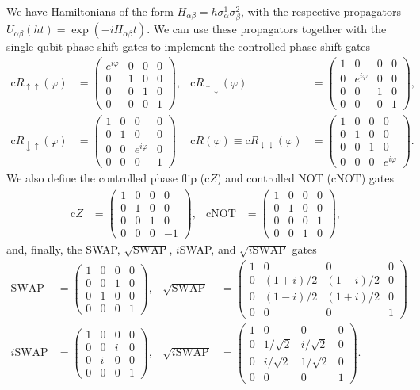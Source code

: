 \documentclass[11pt]{article}
\renewcommand{\t}{\text} %
\newcommand{\p}[1]{\left(#1\right)} %
\renewcommand{\d}{\partial} %
\renewcommand{\phi}{\varphi} %
\newcommand{\m}[1]{\begin{pmatrix}#1\end{pmatrix}} %
\renewcommand{\u}{\uparrow}
\renewcommand{\d}{\downarrow}
\begin{document}
We have Hamiltonians of the form
$H_{\alpha\beta}=h\sigma_\alpha^1\sigma_\beta^2$, with the respective
propagators $U_{\alpha\beta}\p{ht}=\exp\p{-iH_{\alpha\beta}t}$. We can
use these propagators together with the single-qubit phase shift gates
to implement the controlled phase shift gates
\begin{align}
  \t{c}R_{\u\u}\p\phi
  &=\m{e^{i \phi} & 0 & 0 & 0 \\
    0 & 1 & 0 & 0 \\
    0 & 0 & 1 & 0 \\
    0 & 0 & 0 & 1}, & \t{c}R_{\u\d}\p\phi
  &=\m{1 & 0 & 0 & 0 \\
    0 & e^{i \phi} & 0 & 0 \\
    0 & 0 & 1 & 0 \\
    0 & 0 & 0 & 1}, \\
  \t{c}R_{\d\u}\p\phi
  &=\m{1 & 0 & 0 & 0 \\
    0 & 1 & 0 & 0 \\
    0 & 0 & e^{i \phi} & 0 \\
    0 & 0 & 0 & 1} & \t{c}R\p\phi\equiv\t{c}R_{\d\d}\p\phi
  &=\m{1 & 0 & 0 & 0 \\
    0 & 1 & 0 & 0 \\
    0 & 0 & 1 & 0 \\
    0 & 0 & 0 & e^{i \phi}}.
\end{align}
We also define the controlled phase flip ($\t{c}Z$) and controlled NOT
($\t{cNOT}$) gates
\begin{align}
  \t{c}Z&=\m{1 & 0 & 0 & 0 \\
    0 & 1 & 0 & 0 \\
    0 & 0 & 1 & 0 \\
    0 & 0 & 0 & -1}, &
  \t{cNOT}&=\m{1 & 0 & 0 & 0 \\
    0 & 1 & 0 & 0 \\
    0 & 0 & 0 & 1 \\
    0 & 0 & 1 & 0},
\end{align}
and, finally, the SWAP, $\sqrt{\t{SWAP}}$, $i$SWAP, and
$\sqrt{i\t{SWAP}}$ gates
\begin{align}
  \t{SWAP}
  &=\m{1 & 0 & 0 & 0 \\
    0 & 0 & 1 & 0 \\
    0 & 1 & 0 & 0 \\
    0 & 0 & 0 & 1}, & \sqrt{\t{SWAP}}
  &=\m{1 & 0 & 0 & 0 \\
    0 & \p{1+i}/2 & \p{1-i}/2 & 0 \\
    0 & \p{1-i}/2 & \p{1+i}/2 & 0\\
    0 & 0 & 0 & 1} \\
  i\t{SWAP}
  &=\m{1 & 0 & 0 & 0 \\
    0 & 0 & i & 0 \\
    0 & i & 0 & 0 \\
    0 & 0 & 0 & 1}, & \sqrt{i\t{SWAP}}
  &=\m{1 & 0 & 0 & 0 \\
    0 & 1/\sqrt2 & i/\sqrt2 & 0 \\
    0 & i/\sqrt2 & 1/\sqrt2 & 0 \\
    0 & 0 & 0 & 1}.
\end{align}
\end{document}
